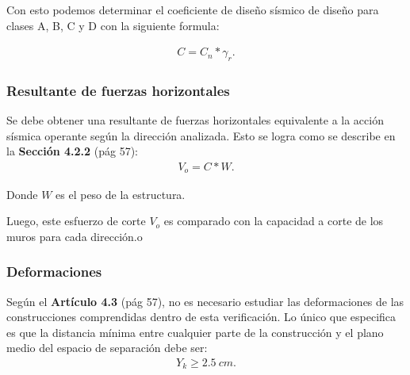 \documentclass[../main.tex]{subfiles}
\begin{document}
Con esto podemos determinar el coeficiente de diseño sísmico de diseño para
clases A, B, C y D con la siguiente formula:

\begin{align*}
  C = C_n * \gamma_r
.\end{align*}

\subsubsection{Resultante de fuerzas horizontales}

Se debe obtener una resultante de fuerzas horizontales equivalente a la acción
sísmica operante según la dirección analizada. Esto se logra como se describe 
en la \textbf{Sección 4.2.2} (pág 57):
\begin{align*}
  V_o = C * W
.\end{align*}

Donde $W$ es el peso de la estructura.

Luego, este esfuerzo de corte $V_o$ es comparado con la capacidad a corte de los
muros para cada dirección.o

\subsubsection{Deformaciones}

Según el \textbf{Artículo 4.3} (pág 57), no es necesario estudiar las
deformaciones de las construcciones comprendidas dentro de esta verificación.
Lo único que especifica es que la distancia mínima entre cualquier parte de
la construcción y el plano medio del espacio de separación debe ser:
\begin{align*}
  Y_k \geq \SI{2.5}{cm}
.\end{align*}
\end{document}
